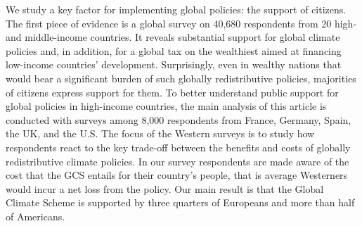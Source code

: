 \documentclass[12pt,english]{article}
\begin{document}
We study a key factor for implementing global policies: the support of citizens. The first piece of evidence is a global survey on 40,680 respondents from 20 high- and middle-income countries. It reveals substantial support for global climate policies and, in addition, for a global tax on the wealthiest aimed at financing low-income countries' development. Surprisingly, even in wealthy nations that would bear a significant burden of such globally redistributive policies, majorities of citizens express support for them. To better understand public support for global policies in high-income countries, the  main analysis of this article is conducted with surveys among 8,000 respondents from France, Germany, Spain, the UK, and the U.S. 
The focus of the Western surveys is to study how respondents react to the key trade-off between the benefits and costs of globally redistributive climate policies. In our survey respondents are made aware of the cost that the GCS entails for their country's people, that is average Westerners would incur a net loss from the policy. Our main result is that the Global Climate Scheme %
is supported by three quarters of Europeans and more than half of Americans. 
\end{document}
